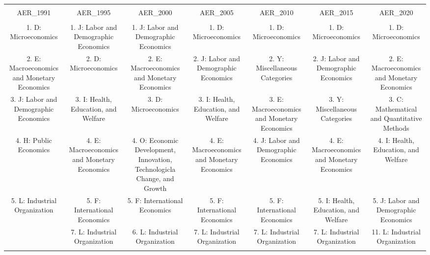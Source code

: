 
\begin{table}[!htbp] \centering 
  \caption{} 
  \label{} 
\begin{tabular}{@{\extracolsep{5pt}} ccccccc} 
\\[-1.8ex]\hline 
\hline \\[-1.8ex] 
AER\_1991 & AER\_1995 & AER\_2000 & AER\_2005 & AER\_2010 & AER\_2015 & AER\_2020 \\ 
\hline \\[-1.8ex] 
1. D: Microeconomics & 1. J: Labor and Demographic Economics & 1. J: Labor and Demographic Economics & 1. D: Microeconomics & 1. D: Microeconomics & 1. D: Microeconomics & 1. D: Microeconomics \\ 
2. E: Macroeconomics and Monetary Economics & 2. D: Microeconomics & 2. E: Macroeconomics and Monetary Economics & 2. J: Labor and Demographic Economics & 2. Y: Miscellaneous Categories & 2. J: Labor and Demographic Economics & 2. E: Macroeconomics and Monetary Economics \\ 
3. J: Labor and Demographic Economics & 3. I: Health, Education, and Welfare & 3. D: Microeconomics & 3. I: Health, Education, and Welfare & 3. E: Macroeconomics and Monetary Economics & 3. Y: Miscellaneous Categories & 3. C: Mathematical and Quantitative Methods \\ 
4. H: Public Economics & 4. E: Macroeconomics and Monetary Economics & 4. O: Economic Development, Innovation, Technologicla Change, and Growth & 4. E: Macroeconomics and Monetary Economics & 4. J: Labor and Demographic Economics & 4. E: Macroeconomics and Monetary Economics & 4. I: Health, Education, and Welfare \\ 
5. L: Industrial Organization & 5. F: International Economics & 5. F: International Economics & 5. F: International Economics & 5. F: International Economics & 5. I: Health, Education, and Welfare & 5. J: Labor and Demographic Economics \\ 
 & 7. L: Industrial Organization & 6. L: Industrial Organization & 7. L: Industrial Organization & 7. L: Industrial Organization & 7. L: Industrial Organization & 11. L: Industrial Organization \\ 
\hline \\[-1.8ex] 
\end{tabular} 
\end{table} 
